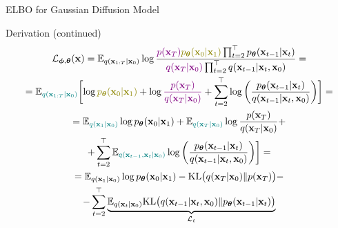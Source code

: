 \documentclass{beamer}
\renewcommand{\nextonslide}[1]{#1}
\begin{document}
\begin{frame}{ELBO for Gaussian Diffusion Model}
    \begin{block}{Derivation (continued)}
        \vspace{-0.7cm}
        {\small
        \begin{multline*}
            \cL_{\bphi, \btheta}(\bx) = \bbE_{q(\bx_{1:T} | \bx_0)} \log \frac{{\color{violet}p(\bx_T)} {\color{olive}\pt(\bx_0 | \bx_1)} \prod_{t=2}^\top \pt(\bx_{t-1} | \bx_t) }{{\color{violet}q(\bx_T | \bx_0)}\prod_{t=2}^\top q(\bx_{t-1}|\bx_t, \bx_0)} 
            \nextonslide{ = \\ = \bbE_{{\color{teal}q(\bx_{1:T} | \bx_0)}} \biggl[ \log {\color{olive}\pt(\bx_0 | \bx_1)} + \log {\color{violet}\frac{p(\bx_T)}{q(\bx_T | \bx_0)}} + \sum_{t=2}^\top \log \left( \frac{\pt(\bx_{t-1} | \bx_t)}{q(\bx_{t-1}|\bx_{t}, \bx_0)}\right) \biggr] }
            \nextonslide{= \\ = \bbE_{{\color{teal}q(\bx_1 | \bx_0)}} \log \pt(\bx_0 | \bx_1) + \bbE_{{\color{teal}q(\bx_T | \bx_0)}} \log \frac{p(\bx_T)}{q(\bx_T | \bx_0)} + \\
             + \sum_{t=2}^\top \bbE_{{\color{teal}q(\bx_{t-1}, \bx_t | \bx_0)}} \log \left( \frac{\pt(\bx_{t-1} | \bx_t)}{q(\bx_{t-1}|\bx_{t}, \bx_0)}\right) \biggr] }
            \nextonslide{= \\ = \bbE_{q(\bx_1 | \bx_0)} \log \pt(\bx_0 | \bx_1) - \KL\bigl(q(\bx_T | \bx_0) \| p(\bx_T)\bigr) - \\
            - \sum_{t=2}^\top \underbrace{ \bbE_{q(\bx_t | \bx_0)} \KL \bigl(q(\bx_{t-1} | \bx_t, \bx_0) \| \pt(\bx_{t-1} | \bx_t)\bigr)}_{\cL_t}}
        \end{multline*}
        }
        \vspace{-0.3cm}
    \end{block}
\end{frame}
\end{document}
